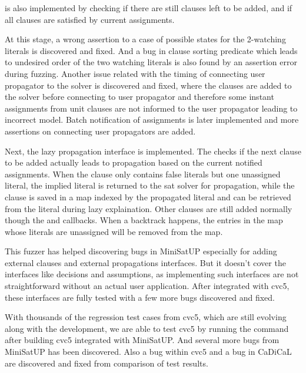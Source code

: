  is also implemented by checking if there are still clauses left to be added, and if all clauses are satisfied by current assignments.

At this stage, a wrong assertion to a case of possible states for the 2-watching literals is discovered and fixed. And a bug in clause sorting predicate which leads to undesired order of the two watching literals is also found by an assertion error during fuzzing. Another issue related with the timing of connecting user propagator to the solver is discovered and fixed, where the clauses are added to the solver before connecting to user propagator and therefore some instant assignments from unit clauses are not informed to the user propagator leading to incorrect model. Batch notification of assignments is later implemented and more assertions on connecting user propagators are added.

Next, the lazy propagation interface is implemented. The  checks if the next clause to be added actually leads to propagation based on the current notified assignments. When the clause only contains false literals but one unassigned literal, the implied literal is returned to the sat solver for propagation, while the clause is saved in a map indexed by the propagated literal and can be retrieved from the literal during lazy explaination. Other clauses are still added normally though the  and  callbacks. When a backtrack happens, the entries in the map whose literals are unassigned will be removed from the map.

This fuzzer has helped discovering bugs in MiniSatUP especially for adding external clauses and external propagations interfaces. But it doesn't cover the interfaces like decisions and assumptions, as implementing such interfaces are not straightforward without an actual user application. After integrated with cvc5, these interfaces are fully tested with a few more bugs discovered and fixed.

With thousands of the regression test cases from cvc5, which are still evolving along with the development, we are able to test cvc5 by running the  command after building cvc5 integrated with MiniSatUP. And several more bugs from MiniSatUP has been discovered. Also a bug within cvc5 and a bug in CaDiCaL are discovered and fixed from comparison of test results.


